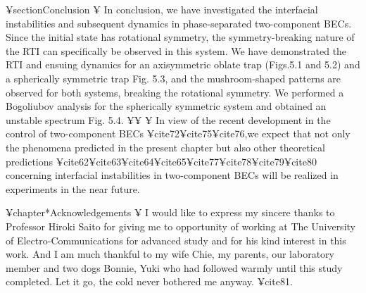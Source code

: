 {{{{{¥section{Conclusion}
¥ In conclusion, we have investigated the interfacial instabilities
and subsequent dynamics in phase-separated two-component
BECs. Since the initial state has rotational symmetry,
the symmetry-breaking nature of the RTI can specifically
be observed in this system. We have demonstrated the RTI and
ensuing dynamics for an axisymmetric oblate trap (Figs.5.1 and 5.2)
and a spherically symmetric trap Fig. 5.3, and the
mushroom-shaped patterns are observed for both systems,
breaking the rotational symmetry. We performed a Bogoliubov
analysis for the spherically symmetric system and obtained an
unstable spectrum Fig. 5.4.
¥¥
¥ In view of the recent development in the control of 
two-component BECs ¥cite{72}¥cite{75}¥cite{76},we expect that not only the 
phenomena predicted in the present chapter but also other
theoretical predictions ¥cite{62}¥cite{63}¥cite{64}¥cite{65}¥cite{77}¥cite{78}¥cite{79}¥cite{80}
concerning interfacial instabilities in
two-component BECs will be realized in experiments in the near future.

¥chapter*{Acknowledgements}
¥ I would like to express my sincere thanks to Professor Hiroki Saito for
giving me to opportunity of working at The University of Electro-Communications
for advanced study and for his kind interest in this work.
And I am much thankful to my wife Chie, my parents, our laboratory member and two dogs Bonnie, Yuki who had followed
warmly until this study completed. Let it go, the cold never bothered me anyway. ¥cite{81}.

}}}}}
